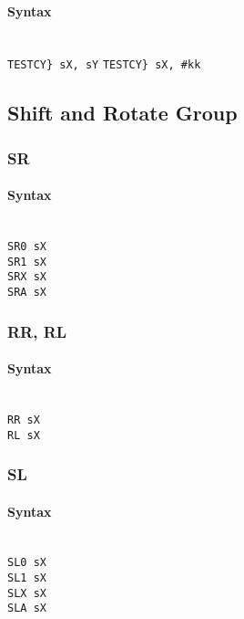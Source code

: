             \paragraph{Syntax}
                ~\\
                \verb'TESTCY} sX, sY'
                \verb'TESTCY} sX, #kk'

    \subsection{Shift and Rotate Group}
        \subsubsection{SR}
            \paragraph{Syntax}
                ~\\
                \verb'SR0 sX'\\
                \verb'SR1 sX'\\
                \verb'SRX sX'\\
                \verb'SRA sX'

        \subsubsection{RR, RL}
            \paragraph{Syntax}
                ~\\
                \verb'RR sX'\\
                \verb'RL sX'

        \subsubsection{SL}
            \paragraph{Syntax}
                ~\\
                \verb'SL0 sX'\\
                \verb'SL1 sX'\\
                \verb'SLX sX'\\
                \verb'SLA sX'


